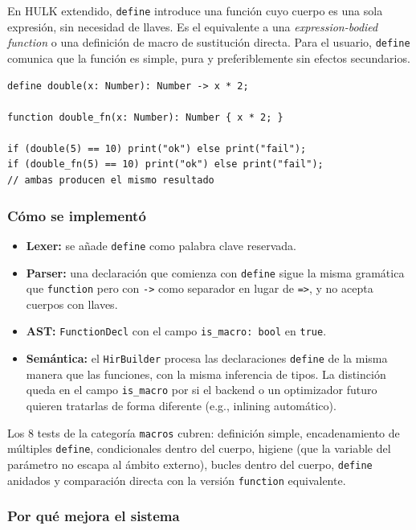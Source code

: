 \documentclass[12pt,letterpaper]{article}
\newcommand{\hulk}{\textsc{HULK}}
\newcommand{\src}[1]{\texttt{#1}}
\begin{document}
En \hulk{} extendido, \src{define} introduce una función cuyo cuerpo es una sola expresión, sin necesidad de llaves. Es el equivalente a una \textit{expression-bodied function} o una definición de macro de sustitución directa. Para el usuario, \src{define} comunica que la función es simple, pura y preferiblemente sin efectos secundarios.

\begin{lstlisting}[language=HULK,caption={Equivalencia entre define y function}]
define double(x: Number): Number -> x * 2;

function double_fn(x: Number): Number { x * 2; }

if (double(5) == 10) print("ok") else print("fail");
if (double_fn(5) == 10) print("ok") else print("fail");
// ambas producen el mismo resultado
\end{lstlisting}

\subsubsection{Cómo se implementó}

\begin{itemize}
    \item \textbf{Lexer:} se añade \src{define} como palabra clave reservada.
    \item \textbf{Parser:} una declaración que comienza con \src{define} sigue la misma gramática que \src{function} pero con \src{->} como separador en lugar de \src{=>}, y no acepta cuerpos con llaves.
    \item \textbf{AST:} \src{FunctionDecl} con el campo \src{is\_macro: bool} en \src{true}.
    \item \textbf{Semántica:} el \src{HirBuilder} procesa las declaraciones \src{define} de la misma manera que las funciones, con la misma inferencia de tipos. La distinción queda en el campo \src{is\_macro} por si el backend o un optimizador futuro quieren tratarlas de forma diferente (e.g., inlining automático).
\end{itemize}

Los 8 tests de la categoría \src{macros} cubren: definición simple, encadenamiento de múltiples \src{define}, condicionales dentro del cuerpo, higiene (que la variable del parámetro no escapa al ámbito externo), bucles dentro del cuerpo, \src{define} anidados y comparación directa con la versión \src{function} equivalente.

\subsubsection{Por qué mejora el sistema}
\end{document}
